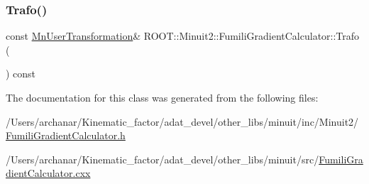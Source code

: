\subsubsection{\texorpdfstring{Trafo()}{Trafo()}\hspace{0.1cm}{\footnotesize\ttfamily [2/2]}}
{\footnotesize\ttfamily const \mbox{\hyperlink{classROOT_1_1Minuit2_1_1MnUserTransformation}{Mn\+User\+Transformation}}\& R\+O\+O\+T\+::\+Minuit2\+::\+Fumili\+Gradient\+Calculator\+::\+Trafo (\begin{DoxyParamCaption}{ }\end{DoxyParamCaption}) const\hspace{0.3cm}{\ttfamily [inline]}}



The documentation for this class was generated from the following files\+:\begin{DoxyCompactItemize}
\item 
/\+Users/archanar/\+Kinematic\+\_\+factor/adat\+\_\+devel/other\+\_\+libs/minuit/inc/\+Minuit2/\mbox{\hyperlink{other__libs_2minuit_2inc_2Minuit2_2FumiliGradientCalculator_8h}{Fumili\+Gradient\+Calculator.\+h}}\item 
/\+Users/archanar/\+Kinematic\+\_\+factor/adat\+\_\+devel/other\+\_\+libs/minuit/src/\mbox{\hyperlink{FumiliGradientCalculator_8cxx}{Fumili\+Gradient\+Calculator.\+cxx}}\end{DoxyCompactItemize}
